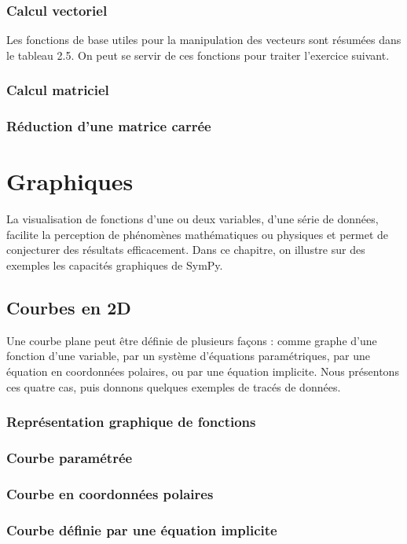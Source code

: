   \subsection{Calcul vectoriel}
  Les fonctions de base utiles pour la manipulation des vecteurs sont résumées dans le tableau 2.5. On peut se servir de ces fonctions pour traiter l'exercice suivant.
  \subsection{Calcul matriciel} 
  \subsection{Réduction d'une matrice carrée}
 \chapter{Graphiques}
La visualisation de fonctions d'une ou deux variables, d'une série de données, facilite la perception de phénomènes mathématiques ou physiques et permet de conjecturer des résultats efficacement. Dans ce chapitre, on illustre sur des exemples les capacités graphiques de SymPy.
 \section{Courbes en 2D}
 Une courbe plane peut être définie de plusieurs façons : comme graphe d’une fonction d’une variable, par un système d’équations paramétriques, par une équation en coordonnées polaires, ou par une équation implicite. Nous présentons
ces quatre cas, puis donnons quelques exemples de tracés de données.
 \subsection{Représentation graphique de fonctions}
 \subsection{Courbe paramétrée}
 \subsection{Courbe en coordonnées polaires}
 \subsection{Courbe définie par une équation implicite}
